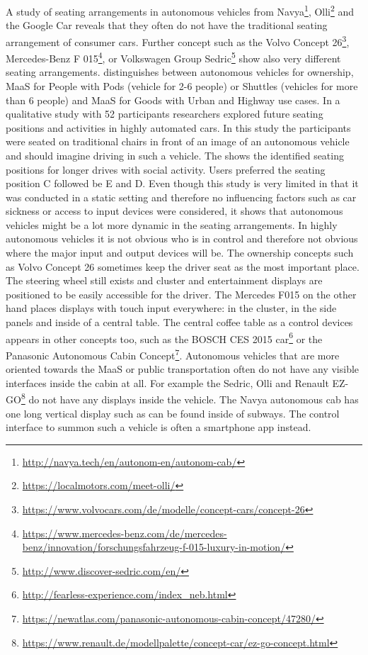 A study of seating arrangements in autonomous vehicles from Navya\footnote{\url{http://navya.tech/en/autonom-en/autonom-cab/}}, Olli\footnote{\url{https://localmotors.com/meet-olli/}} and the Google Car reveals that they often do not have the traditional seating arrangement of consumer cars. Further concept such as the Volvo Concept 26\footnote{\url{https://www.volvocars.com/de/modelle/concept-cars/concept-26}}, Mercedes-Benz F 015\footnote{\url{https://www.mercedes-benz.com/de/mercedes-benz/innovation/forschungsfahrzeug-f-015-luxury-in-motion/}}, or Volkswagen Group Sedric\footnote{\url{http://www.discover-sedric.com/en/}} show also very different seating arrangements. \cite{Jungwirth2017LeadershipGroup} distinguishes between autonomous vehicles for ownership, MaaS for People with Pods (vehicle for 2-6 people) or Shuttles (vehicles for more than 6 people) and MaaS for Goods with Urban and Highway use cases. In a qualitative study \cite{Jorlov2017} with 52 participants researchers explored future seating positions and activities in highly automated cars. In this study the participants were seated on traditional chairs in front of an image of an autonomous vehicle and should imagine driving in such a vehicle. The  shows the identified seating positions for longer drives with social activity. Users preferred the seating position C followed be E and D. Even though this study is very limited in that it was conducted in a static setting and therefore no influencing factors such as car sickness or access to input devices were considered, it shows that autonomous vehicles might be a lot more dynamic in the seating arrangements.  In highly autonomous vehicles it is not obvious who is in control and therefore not obvious where the major input and output devices will be. The ownership concepts such as Volvo Concept 26 sometimes keep the driver seat as the most important place. The steering wheel still exists and cluster and entertainment displays are positioned to be easily accessible for the driver. The Mercedes F015 on the other hand places displays with touch input everywhere: in the cluster, in the side panels and inside of a central table. The central coffee table as a control devices appears in other concepts too, such as the BOSCH CES 2015 car\footnote{\url{http://fearless-experience.com/index_neb.html}} or the Panasonic Autonomous Cabin Concept\footnote{\url{https://newatlas.com/panasonic-autonomous-cabin-concept/47280/}}. Autonomous vehicles that are more oriented towards the MaaS or public transportation often do not have any visible interfaces inside the cabin at all. For example the Sedric, Olli and Renault EZ-GO\footnote{\url{https://www.renault.de/modellpalette/concept-car/ez-go-concept.html}} do not have any displays inside the vehicle. The Navya autonomous cab has one long vertical display such as can be found inside of subways. The control interface to summon such a vehicle is often a smartphone app instead. 

